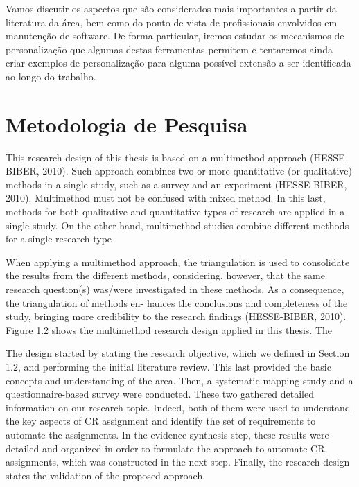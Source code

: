 Vamos discutir os aspectos que são considerados mais importantes a partir da literatura da área, bem
como do ponto de vista de profissionais envolvidos em manutenção de software. De forma particular,
iremos estudar os mecanismos de personalização que algumas destas ferramentas permitem e tentaremos
ainda criar exemplos de personalização para alguma possível extensão a ser identificada ao longo do
trabalho.

\section{Metodologia de Pesquisa}
\label{sec:intro-metodologia}


This research design of this thesis is based on a multimethod approach (HESSE-BIBER,
2010). Such approach combines two or more quantitative (or qualitative) methods in a single study,
such as a survey and an experiment (HESSE-BIBER, 2010). Multimethod must not be confused with mixed
method. In this last, methods for both qualitative and quantitative types of research are applied in
a single study. On the other hand, multimethod studies combine different methods for a single
research type

When applying a multimethod approach, the triangulation is used to consolidate the
results from the different methods, considering, however, that the same research question(s)
was/were investigated in these methods. As a consequence, the triangulation of methods en- hances
the conclusions and completeness of the study, bringing more credibility to the research findings
(HESSE-BIBER, 2010). Figure 1.2 shows the multimethod research design applied in this thesis. The

The design started by stating the research objective, which we defined in Section 1.2, and
performing the initial literature review. This last provided the basic concepts and understanding of
the area. Then, a systematic mapping study and a questionnaire-based survey were conducted. These
two gathered detailed information on our research topic. Indeed, both of them were used to
understand the key aspects of CR assignment and identify the set of requirements to automate the
assignments. In the evidence synthesis step, these results were detailed and organized in order to
formulate the approach to automate CR assignments, which was constructed in the next step. Finally,
the research design states the validation of the proposed approach.

